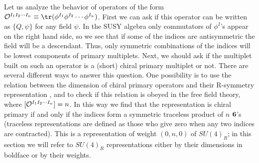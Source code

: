 Let us analyze the behavior of operators of the form ${\cal O}^{I_1
I_2 \cdots I_n} \equiv \tr(\phi^{I_1} \phi^{I_2} \cdots \phi^{I_n})$.
First we can ask if this operator can be written as $\{Q,\psi\}$ for
any field $\psi$. In the SUSY algebra
 only commutators of $\phi^I$'s appear on the right
hand side, so we see that if some of the indices are antisymmetric the
field will be a descendant. Thus, only symmetric combinations of the
indices will be lowest components of primary multiplets. Next, we
should ask if the multiplet built on such an operator is a (short)
chiral primary multiplet or not. There are several different ways to
answer this question. One possibility is to use the relation between
the dimension of chiral primary operators and their R-symmetry
representation \cite{Kac:1977hp,Dobrev:1987qz,Dobrev:1985qv,
Seiberg:1997ax,Minwalla:1998ka}, and to check if this relation is
obeyed in the free field theory, where $[{\cal O}^{I_1 I_2 \cdots
I_n}] = n$. In this way we find that the representation is chiral
primary if and only if the indices form a symmetric traceless product
of $n$ $\bf 6$'s (traceless representations are defined as those who
give zero when any two indices are contracted). This is a representation
of weight $(0,n,0)$ of $SU(4)_R$; in this section we will refer to
$SU(4)_R$ representations either by their dimensions in boldface or by
their weights.

